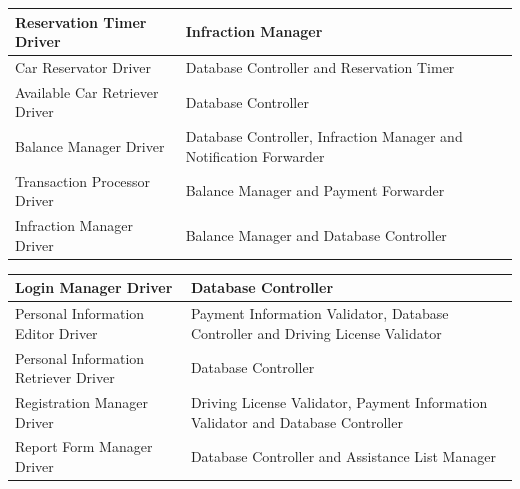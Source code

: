 \documentclass{article}
\begin{document}
\begin{tabular}{ |p{5cm}|p{7cm}| }
  \hline
  Reservation Timer Driver & Infraction Manager\\
  \hline
  Car Reservator Driver & Database Controller and Reservation Timer\\
  \hline
  Available Car Retriever Driver & Database Controller\\
  \hline
  Balance Manager Driver & Database Controller, Infraction Manager and Notification Forwarder\\
  \hline
  Transaction Processor Driver & Balance Manager and Payment Forwarder\\
  \hline
  Infraction Manager Driver & Balance Manager and Database Controller\\
  \hline
\end{tabular}
\begin{tabular}{ |p{5cm}|p{7cm}| }
 \hline
  Login Manager Driver & Database Controller\\
  \hline
  Personal Information Editor Driver & Payment Information Validator, Database Controller and Driving License Validator\\
  \hline
  Personal Information Retriever Driver & Database Controller\\
  \hline
   Registration Manager Driver & Driving License Validator, Payment Information Validator and Database Controller\\
  \hline
   Report Form Manager Driver & Database Controller and Assistance List Manager\\
   \hline
\end{tabular}
\newpage
\end{document}
